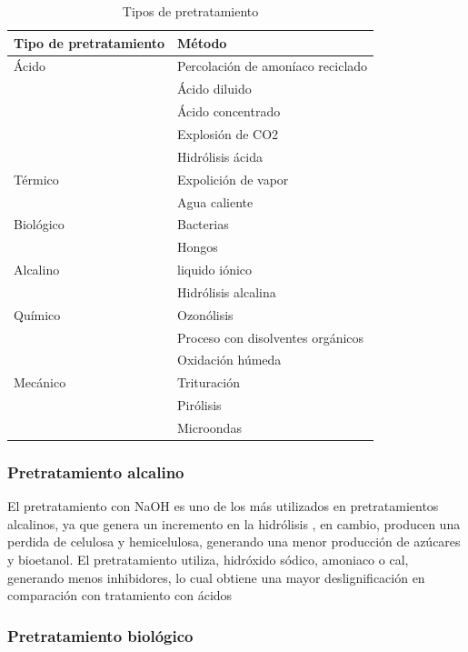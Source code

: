 \documentclass[12pt]{article}
\begin{document}
		\begin{table}[H]
		\centering  
		\caption{Tipos de pretratamiento }%
		\begin{tabular}{  | p{5cm} | p{6.5cm} |}
		\hline\textbf{ Tipo de pretratamiento} & \textbf{ Método}\\ \hline 
		Ácido     & Percolación de amoníaco reciclado  \\ 
		&  Ácido diluido  \\
		&  Ácido concentrado \\
		&   Explosión de CO2  \\ 
		&   Hidrólisis ácida \\ \hline 
		Térmico   & Expolición de vapor\\
		&  Agua caliente \\ \hline
		Biológico & Bacterias \\
		&  Hongos \\ \hline
		Alcalino  & liquido iónico  \\
		& Hidrólisis alcalina \\ \hline
		Químico   & Ozonólisis\\
		&  Proceso con disolventes orgánicos\\
		& Oxidación húmeda \\ \hline
		Mecánico  & Trituración \\
		&  Pirólisis \\
		&  Microondas \\ \hline
		
		\end{tabular}
		\label{tipos de pretratamientos}
	\end{table}


\subsubsection{Pretratamiento alcalino}

El pretratamiento con NaOH es uno de los más utilizados en pretratamientos alcalinos,  ya que genera un incremento en la hidrólisis \cite{espinosa2021pretratamiento}, en cambio, producen una perdida de celulosa y hemicelulosa, generando una menor producción de azúcares y bioetanol.
El pretratamiento utiliza, hidróxido sódico, amoniaco o cal, generando menos inhibidores, lo cual obtiene una mayor deslignificación en comparación con tratamiento con ácidos %

\subsubsection{Pretratamiento biológico }
\end{document}

